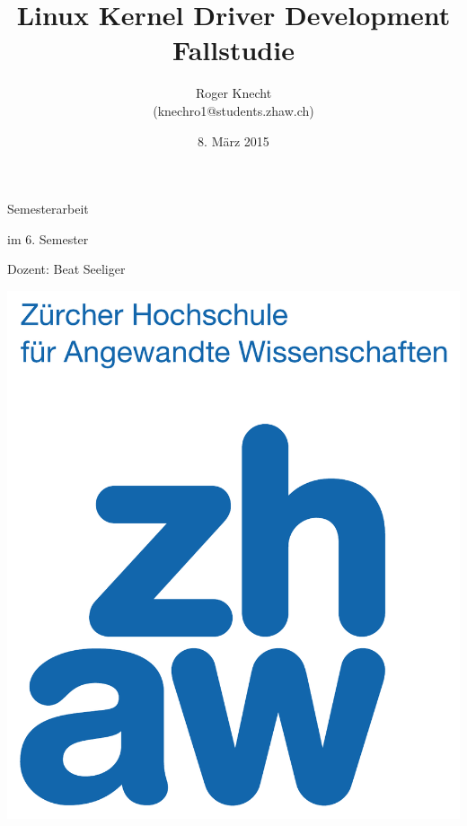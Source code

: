 \title{Linux Kernel Driver Development \\ \vspace{1.0cm} \huge Fallstudie}
\date{8. März 2015}
\author{Roger Knecht \\ (knechro1@students.zhaw.ch)}

\sffamily
\maketitle
\vfill
\begin{center}
	Semesterarbeit

	\vspace{0.5cm}
	\Large
	\normalsize

	im 6. Semester
	
	\vspace{0.5cm}
	Dozent: Beat Seeliger 
	\vfill
	\vspace{0.7cm}
   \begin{center}
   	\includegraphics[scale=0.2]{images/zhaw}
   \end{center}
	\vfill


\end{center}
